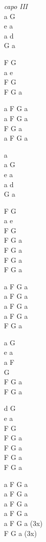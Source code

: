 \begin{chord}
    \begin{tinyTwelve}
    \textit{capo III}\\
    a G\\
    e a\\
    a d\\
    G a

    F G\\
    a e\\
    F G\\
    F G a

    a F G a\\
    a F G a\\
    F G a\\
    a F G a

    a\\
    a G\\
    e a\\
    a d\\
    G a

    F G\\
    a  e\\
    F G\\
    F G a\\
    F G a\\
    F G a\\
    F G a

    a F G a\\
    a F G a\\
    a F G a\\
    a F G a\\
    F G a

a G\\
e a\\
a F\\
G\\
F G a\\
F G a

d G\\
e a\\
F G\\
F G a\\
F G a\\
F G a\\
F G a

a F G a\\
a F G a\\
a F G a\\
a F G a\\
a F G a (3x)\\
F G a (3x)
\end{tinyTwelve}
\end{chord}
